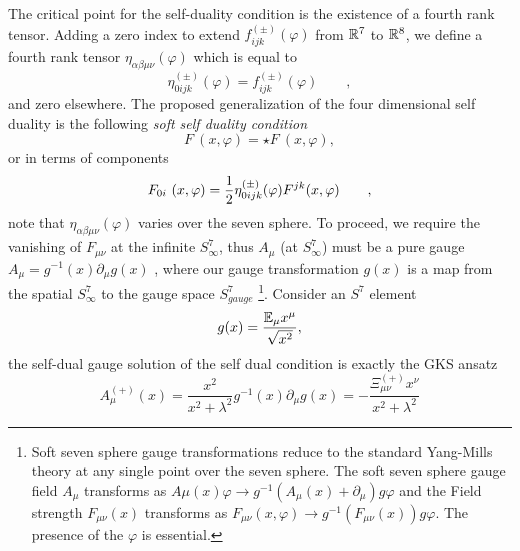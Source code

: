 \documentclass[a4paper,12pt]{book}
\begin{document}
The critical point for the self-duality condition is the existence of a
fourth rank tensor. Adding a zero index to extend $f_{ijk}^{\left( \pm
\right) }({\varphi })$ from $\Bbb{R}^{7}$ to $\Bbb{R}^{8}$, we define a
fourth rank tensor $\eta _{\alpha \beta \mu \nu }({\varphi })$ which is
equal to 
\begin{equation}
\eta _{0ijk}^{\left( \pm \right) }({\varphi })=f_{ijk}^{\left( \pm \right) }(%
{\varphi })\qquad ,  \label{sel}
\end{equation}
and zero elsewhere. The proposed generalization of the four dimensional self
duality is the following \emph{soft self duality condition} 
\begin{equation}
F{\ (x,{\varphi })}=\star F{\ (x,{\varphi })},
\end{equation}
or in terms of components 
\begin{equation}
F_{0i}{\ (x,{\varphi })}=\frac{1}{2}\eta _{0ijk}^{\left( \pm \right) }({%
\varphi })F^{jk}(x,{\varphi })\qquad ,  \label{a3}
\end{equation}
note that $\eta _{\alpha \beta \mu \nu }({\varphi })$ varies over the seven
sphere. To proceed, we require the vanishing of $F_{\mu \nu }$ at the
infinite $S_{\infty }^{7}$, thus $A_{\mu }$ (at $S_{\infty }^{7}$) must be a
pure gauge $A_{\mu }=g^{-1}\left( x\right) \partial _{\mu }g\left( x\right) $%
, where our gauge transformation $g\left( x\right) $ is a map from the
spatial $S_{\infty }^{7}$ to the gauge space $S_{gauge}^{7}$ \footnote{%
Soft seven sphere gauge transformations reduce to the standard Yang-Mills
theory at any single point over the seven sphere. The soft seven sphere
gauge field $A_{\mu }$ transforms as $A\mu \left( x\right) \varphi
\rightarrow g^{-1}\left( A_{\mu }\left( x\right) +\partial _{\mu }\right)
g\varphi $ and the Field strength $F_{\mu \nu }\left( x\right) $ transforms
as $F_{\mu \nu }\left( x,\varphi \right) \rightarrow g^{-1}\left( F_{\mu \nu
}\left( x\right) \right) g\varphi .$ The presence of the $\varphi $ is
essential.}. Consider an $S^{7}$ element 
\begin{equation}
g(x)=\frac{\Bbb{E}_{\mu }x^{\mu }}{\sqrt{x^{2}}},  \label{gg}
\end{equation}
the self-dual gauge solution of the self dual condition is exactly the GKS
ansatz 
\begin{equation}
A_{\mu }^{(+)}(x)=\frac{x^{2}}{x^{2}+\lambda ^{2}}g^{-1}(x)\partial _{\mu
}g(x)=-\frac{\Xi _{\mu \nu }^{\left( +\right) }x^{\nu }}{x^{2}+\lambda ^{2}}
\label{sol1}
\end{equation}
\end{document}
